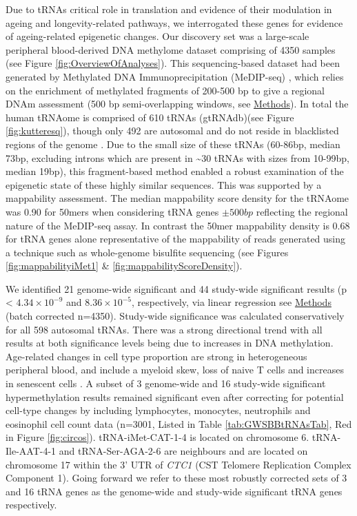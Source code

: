 \documentclass[
]{book}
\begin{document}
Due to tRNAs critical role in translation and evidence of their modulation in ageing and longevity-related pathways, we interrogated these genes for evidence of ageing-related epigenetic changes.
Our discovery set was a large-scale peripheral blood-derived DNA methylome dataset comprising of 4350 samples (see Figure \ref{fig:OverviewOfAnalyses}).
This sequencing-based dataset had been generated by Methylated DNA Immunoprecipitation (MeDIP-seq) \citep{Down2009}, which relies on the enrichment of methylated fragments of 200-500 bp to give a regional DNAm assessment (500 bp semi-overlapping windows, see \protect\hyperlink{EpiTwinsMethods}{Methods}).
In total the human tRNAome is comprised of 610 tRNAs (gtRNAdb)(see Figure \ref{fig:kutteresq}), though only 492 are autosomal and do not reside in blacklisted regions of the genome \citep{Amemiya2019}.
Due to the small size of these tRNAs (60-86bp, median 73bp, excluding introns which are present in \textasciitilde30 tRNAs with sizes from 10-99bp, median 19bp), this fragment-based method enabled a robust examination of the epigenetic state of these highly similar sequences.
This was supported by a mappability assessment.
The median mappability score density for the tRNAome was 0.90 for 50mers when considering tRNA genes \(\pm500bp\) reflecting the regional nature of the MeDIP-seq assay.
In contrast the 50mer mappability density is 0.68 for tRNA genes alone representative of the mappability of reads generated using a technique such as whole-genome bisulfite sequencing (see Figures \ref{fig:mappabilityiMet1} \& \ref{fig:mappabilityScoreDensity}).

We identified 21 genome-wide significant and 44 study-wide significant results (p \textless{} \(4.34\times10^{-9}\) and \(8.36\times10^{-5}\), respectively, via linear regression see \protect\hyperlink{medipmodels}{Methods} (batch corrected n=4350).
Study-wide significance was calculated conservatively for all 598 autosomal tRNAs.
There was a strong directional trend with all results at both significance levels being due to increases in DNA methylation.
Age-related changes in cell type proportion are strong in heterogeneous peripheral blood, and include a myeloid skew, loss of naive T cells and increases in senescent cells \citep{Geiger2013}.
A subset of 3 genome-wide and 16 study-wide significant hypermethylation results remained significant even after correcting for potential cell-type changes by including lymphocytes, monocytes, neutrophils and eosinophil cell count data (n=3001, Listed in Table \ref{tab:GWSBBtRNAsTab}, Red in Figure \ref{fig:circos}).
tRNA-iMet-CAT-1-4 is located on chromosome 6.
tRNA-Ile-AAT-4-1 and tRNA-Ser-AGA-2-6 are neighbours and are located on chromosome 17 within the 3' UTR of \emph{CTC1} (CST Telomere Replication Complex Component 1).
Going forward we refer to these most robustly corrected sets of 3 and 16 tRNA genes as the genome-wide and study-wide significant tRNA genes respectively.
\end{document}
